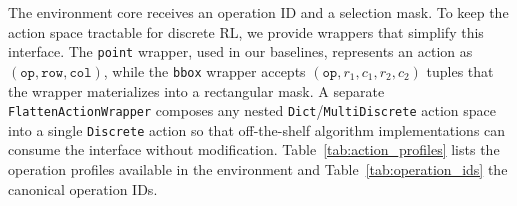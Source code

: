 The environment core receives an operation ID and a selection mask. To keep the action space tractable for discrete RL, we provide wrappers that simplify this interface. The \texttt{point} wrapper, used in our baselines, represents an action as $(\texttt{op}, \texttt{row}, \texttt{col})$, while the \texttt{bbox} wrapper accepts $(\texttt{op}, r_1, c_1, r_2, c_2)$ tuples that the wrapper materializes into a rectangular mask. A separate \texttt{FlattenActionWrapper} composes any nested \texttt{Dict}/\texttt{MultiDiscrete} action space into a single \texttt{Discrete} action so that off-the-shelf algorithm implementations can consume the interface without modification. Table~\ref{tab:action_profiles} lists the operation profiles available in the environment and Table~\ref{tab:operation_ids} the canonical operation IDs.

\begin{table}[htbp]
\centering
\caption{Operation profiles in JaxARC.}
\label{tab:action_profiles}
\scriptsize
{}
\end{table}

\begin{table}[htbp]
\centering
\caption{Canonical operation identifiers in JaxARC.}
\label{tab:operation_ids}
\scriptsize
{}
\end{table}

